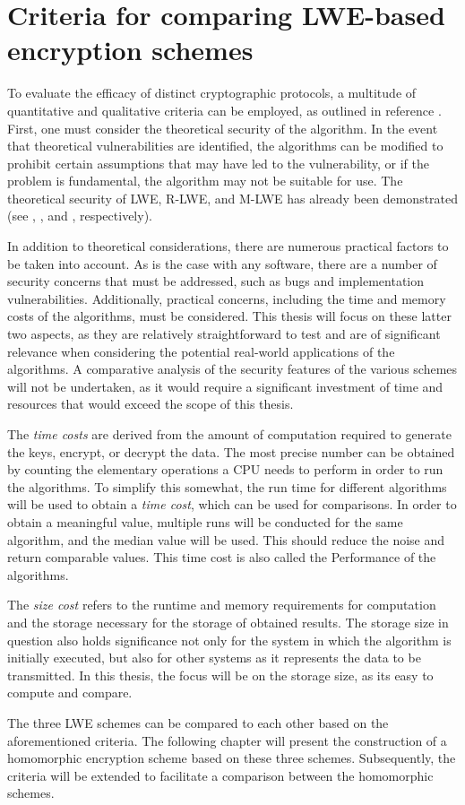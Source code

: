 \section{Criteria for comparing LWE-based encryption schemes}
\label{sec:LweComparisonCriteria}

To evaluate the efficacy of distinct cryptographic protocols, a multitude of quantitative and qualitative criteria can be employed, as outlined in reference \cite{CryptoMetrics}. First, one must consider the theoretical security of the algorithm. In the event that theoretical vulnerabilities are identified, the algorithms can be modified to prohibit certain assumptions that may have led to the vulnerability, or if the problem is fundamental, the algorithm may not be suitable for use. The theoretical security of LWE, R-LWE, and M-LWE has already been demonstrated (see \cite{Regev2005OnLL}, \cite{RLWEproof}, and \cite{MLWEproof}, respectively).

In addition to theoretical considerations, there are numerous practical factors to be taken into account. As is the case with any software, there are a number of security concerns that must be addressed, such as bugs and implementation vulnerabilities. Additionally, practical concerns, including the time and memory costs of the algorithms, must be considered. This thesis will focus on these latter two aspects, as they are relatively straightforward to test and are of significant relevance when considering the potential real-world applications of the algorithms. A comparative analysis of the security features of the various schemes will not be undertaken, as it would require a significant investment of time and resources that would exceed the scope of this thesis.

The \textit{time costs} are derived from the amount of computation required to generate the keys, encrypt, or decrypt the data. The most precise number can be obtained by counting the elementary operations a CPU needs to perform in order to run the algorithms. To simplify this somewhat, the run time for different algorithms will be used to obtain a \textit{time cost}, which can be used for comparisons. In order to obtain a meaningful value, multiple runs will be conducted for the same algorithm, and the median value will be used. This should reduce the noise and return comparable values. This time cost is also called the Performance of the algorithms.

The \textit{size cost} refers to the runtime and memory requirements for computation and the storage necessary for the storage of obtained results. The storage size in question also holds significance not only for the system in which the algorithm is initially executed, but also for other systems as it represents the data to be transmitted. In this thesis, the focus will be on the storage size, as its easy to compute and compare.

The three LWE schemes can be compared to each other based on the aforementioned criteria. The following chapter will present the construction of a homomorphic encryption scheme based on these three schemes. Subsequently, the criteria will be extended to facilitate a comparison between the homomorphic schemes.
